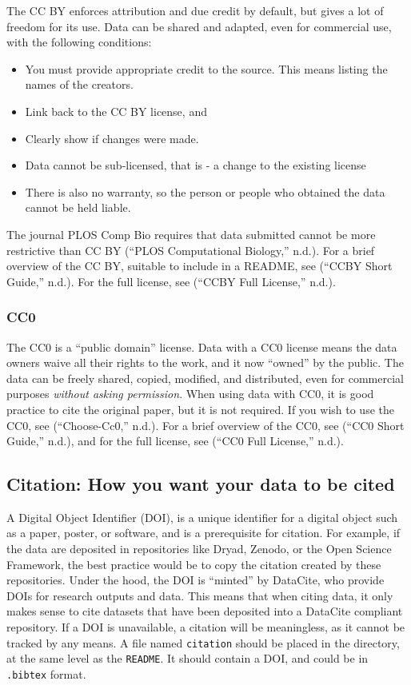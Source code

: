 \documentclass[
]{article}
\providecommand{\tightlist}{%
  \setlength{\itemsep}{0pt}\setlength{\parskip}{0pt}}
\begin{document}
The CC BY enforces attribution and due credit by default, but gives a lot of freedom for its use. Data can be shared and adapted, even for commercial use, with the following conditions:

\begin{itemize}
\tightlist
\item
  You must provide appropriate credit to the source. This means listing the names of the creators.
\item
  Link back to the CC BY license, and
\item
  Clearly show if changes were made.
\item
  Data cannot be sub-licensed, that is - a change to the existing license
\item
  There is also no warranty, so the person or people who obtained the data cannot be held liable.
\end{itemize}

The journal PLOS Comp Bio requires that data submitted cannot be more restrictive than CC BY (``PLOS Computational Biology,'' n.d.). For a brief overview of the CC BY, suitable to include in a README, see (``CCBY Short Guide,'' n.d.). For the full license, see (``CCBY Full License,'' n.d.).

\hypertarget{cc0}{%
\subsubsection{CC0}\label{cc0}}

The CC0 is a ``public domain'' license. Data with a CC0 license means the data owners waive all their rights to the work, and it now ``owned'' by the public. The data can be freely shared, copied, modified, and distributed, even for commercial purposes \emph{without asking permission}. When using data with CC0, it is good practice to cite the original paper, but it is not required. If you wish to use the CC0, see (``Choose-Cc0,'' n.d.). For a brief overview of the CC0, see (``CC0 Short Guide,'' n.d.), and for the full license, see (``CC0 Full License,'' n.d.).

\hypertarget{cite}{%
\subsection{Citation: How you want your data to be cited}\label{cite}}

A Digital Object Identifier (DOI), is a unique identifier for a digital object such as a paper, poster, or software, and is a prerequisite for citation. For example, if the data are deposited in repositories like Dryad, Zenodo, or the Open Science Framework, the best practice would be to copy the citation created by these repositories. Under the hood, the DOI is ``minted'' by DataCite, who provide DOIs for research outputs and data. This means that when citing data, it only makes sense to cite datasets that have been deposited into a DataCite compliant repository. If a DOI is unavailable, a citation will be meaningless, as it cannot be tracked by any means. A file named \texttt{citation} should be placed in the directory, at the same level as the \texttt{README}. It should contain a DOI, and could be in \texttt{.bibtex} format.
\end{document}

